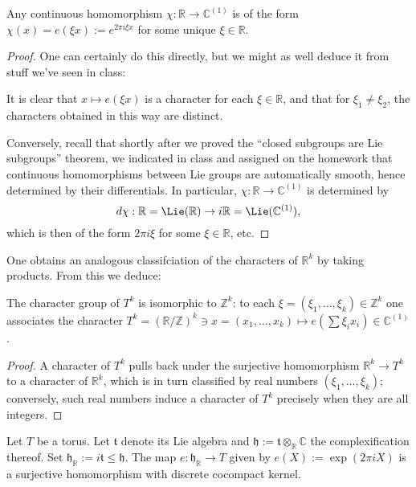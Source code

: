 \documentclass[reqno]{amsart} 
\begin{document}
\begin{lemma}\label{lem:characters-of-the-reals}
  Any continuous homomorphism $\chi : \mathbb{R} \rightarrow \mathbb{C}^{(1)}$ is of the form $\chi(x) = e(\xi x) := e^{2 \pi i \xi x}$ for some unique $\xi \in \mathbb{R}$.
\end{lemma}
\begin{proof}
  One can certainly do this directly, but we might as well deduce it from stuff we've seen in class:

  It is clear that $x \mapsto e(\xi x)$ is a character for each $\xi \in \mathbb{R}$, and that for $\xi_1 \neq \xi_2$, the characters obtained in this way are distinct.

  Conversely, recall that shortly after we proved the ``closed subgroups are Lie subgroups'' theorem, we indicated in class and assigned on the homework that continuous homomorphisms between Lie groups are automatically smooth, hence determined by their differentials.  In particular, $\chi : \mathbb{R} \rightarrow \mathbb{C}^{(1)}$ is determined by
  \begin{equation*}
    d \chi : \mathbb{R} = \Lie(\mathbb{R}) \rightarrow i \mathbb{R} = \Lie(\mathbb{C}^{(1)}),
  \end{equation*}
  which is then of the form $2 \pi i \xi$ for some $\xi \in \mathbb{R}$, etc.
\end{proof}
One obtains an analogous classifciation of the characters of $\mathbb{R}^k$ by taking products.  From this we deduce:

\begin{lemma}\label{lem:char-gp-of-Tk}
  The character group of $T^k$ is isomorphic to $\mathbb{Z}^k$: to each $\xi = (\xi_1,\dotsc,\xi_k) \in \mathbb{Z}^k$ one associates the character $T^k = (\mathbb{R}/\mathbb{Z})^k \ni x = (x_1,\dotsc,x_k) \mapsto e(\sum \xi_i x_i) \in \mathbb{C}^{(1)}$.
\end{lemma}
\begin{proof}
  A character of $T^k$ pulls back under the surjective homomorphism $\mathbb{R}^k \rightarrow T^k$ to a character of $\mathbb{R}^k$, which is in turn classified by real numbers $(\xi_1,\dotsc,\xi_k)$; conversely, such real numbers induce a character of $T^k$ precisely when they are all integers.
\end{proof}

Let $T$ be a torus.  Let $\mathfrak{t}$ denote its Lie algebra and $\mathfrak{h} := \mathfrak{t} \otimes_{\mathbb{R}} \mathbb{C}$ the complexification thereof.  Set $\mathfrak{h}_{\mathbb{R}} := i \mathfrak{t} \leq \mathfrak{h}$.  The map $e : \mathfrak{h}_\mathbb{R} \rightarrow T$ given by $e(X) := \exp(2 \pi i X)$ is a surjective homomorphism with discrete cocompact kernel.
\end{document}
